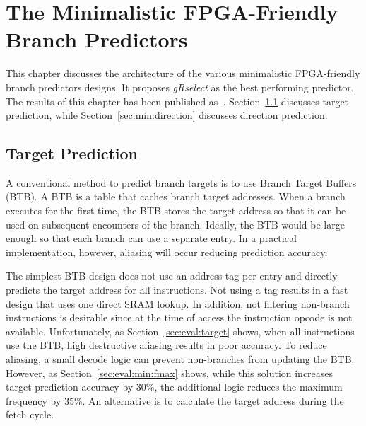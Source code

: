 \chapter{The Minimalistic FPGA-Friendly Branch Predictors}
\label{chap:minimal}
This chapter discusses the architecture of the various minimalistic FPGA-friendly branch predictors designs. It proposes \textit{gRselect} as the best performing predictor. The results of this chapter has been published as~\cite{grselect}. Section~\ref{sec:min:target} discusses target prediction, while Section~\ref{sec:min:direction} discusses direction prediction.

\section{Target Prediction}
\label{sec:min:target}
A conventional method to predict branch targets is to use Branch Target Buffers (BTB). A BTB is a table that caches branch target addresses. When a branch executes for the first time, the BTB stores the target address so that it can be used on subsequent encounters of the branch. Ideally, the BTB would be large enough so that each branch can use a separate entry. In a practical implementation, however, aliasing will occur reducing prediction accuracy.  

The simplest BTB design does not use an address tag per entry and directly predicts the target address for all instructions. Not using a tag results in a fast design that uses one direct SRAM lookup. In addition, not filtering non-branch instructions is desirable since at the time of access the instruction opcode is not available. Unfortunately, as Section~\ref{sec:eval:target} shows, when all instructions use the BTB, high destructive aliasing results in poor accuracy. To reduce aliasing, a small decode logic can prevent non-branches from updating the BTB. However, as Section~\ref{sec:eval:min:fmax} shows, while this solution increases target prediction accuracy by 30\%, the additional logic reduces the maximum frequency by 35\%. An alternative is to calculate the target address during the fetch cycle.


